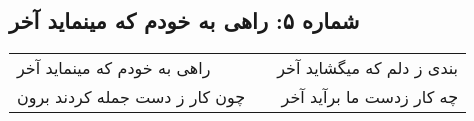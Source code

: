 \begin{center}
\section*{شماره ۵: راهی به خودم که مینماید آخر}
\label{sec:005}
\begin{longtable}{l p{0.5cm} r}
راهی به خودم که مینماید آخر
&&
بندی ز دلم که میگشاید آخر
\\
چون کار ز دست جمله کردند برون
&&
چه کار زدست ما برآید آخر
\\
\end{longtable}
\end{center}
